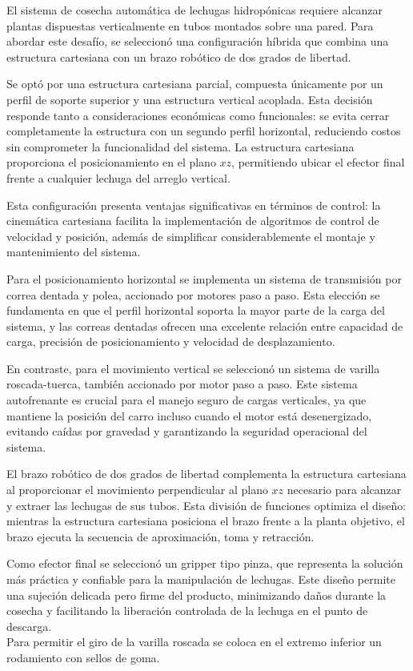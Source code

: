 El sistema de cosecha automática de lechugas hidropónicas requiere alcanzar plantas dispuestas verticalmente en tubos montados sobre una pared. Para abordar este desafío, se seleccionó una configuración híbrida que combina una estructura cartesiana con un brazo robótico de dos grados de libertad.

Se optó por una estructura cartesiana parcial, compuesta únicamente por un perfil de soporte superior y una estructura vertical acoplada. Esta decisión responde tanto a consideraciones económicas como funcionales: se evita cerrar completamente la estructura con un segundo perfil horizontal, reduciendo costos sin comprometer la funcionalidad del sistema. La estructura cartesiana proporciona el posicionamiento en el plano $xz$, permitiendo ubicar el efector final frente a cualquier lechuga del arreglo vertical.

Esta configuración presenta ventajas significativas en términos de control: la cinemática cartesiana facilita la implementación de algoritmos de control de velocidad y posición, además de simplificar considerablemente el montaje y mantenimiento del sistema.

Para el posicionamiento horizontal se implementa un sistema de transmisión por correa dentada y polea, accionado por motores paso a paso. Esta elección se fundamenta en que el perfil horizontal soporta la mayor parte de la carga del sistema, y las correas dentadas ofrecen una excelente relación entre capacidad de carga, precisión de posicionamiento y velocidad de desplazamiento.

En contraste, para el movimiento vertical se seleccionó un sistema de varilla roscada-tuerca, también accionado por motor paso a paso. Este sistema autofrenante es crucial para el manejo seguro de cargas verticales, ya que mantiene la posición del carro incluso cuando el motor está desenergizado, evitando caídas por gravedad y garantizando la seguridad operacional del sistema.

El brazo robótico de dos grados de libertad complementa la estructura cartesiana al proporcionar el movimiento perpendicular al plano $xz$ necesario para alcanzar y extraer las lechugas de sus tubos. Esta división de funciones optimiza el diseño: mientras la estructura cartesiana posiciona el brazo frente a la planta objetivo, el brazo ejecuta la secuencia de aproximación, toma y retracción.

Como efector final se seleccionó un gripper tipo pinza, que representa la solución más práctica y confiable para la manipulación de lechugas. Este diseño permite una sujeción delicada pero firme del producto, minimizando daños durante la cosecha y facilitando la liberación controlada de la lechuga en el punto de descarga.\\

Para permitir el giro de la varilla roscada se coloca en el extremo inferior un rodamiento con sellos de goma.
